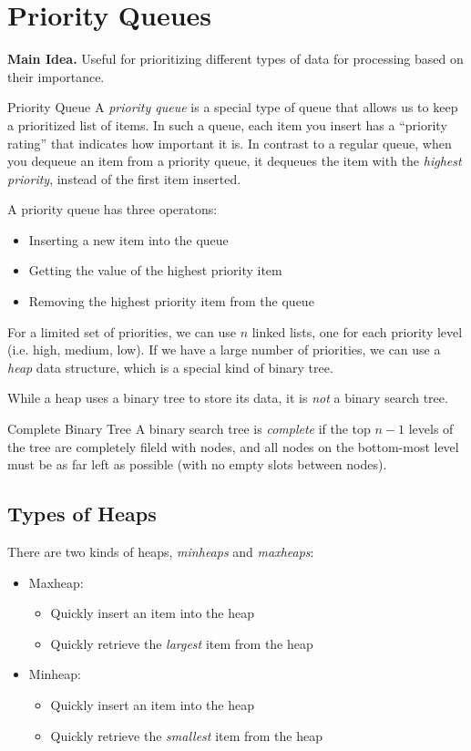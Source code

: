 \documentclass[class=article, crop=false]{standalone}
\begin{document}
  \section{Priority Queues}
  \textbf{Main Idea.} Useful for prioritizing different types of data for processing based on their importance.
  \begin{definition}{Priority Queue}
    A \emph{priority queue} is a special type of queue that allows us to keep a prioritized list of items. In such a queue, each item you insert has a ``priority rating'' that indicates how important it is. In contrast to a regular queue, when you dequeue an item from a priority queue, it dequeues the item with the \emph{highest priority}, instead of the first item inserted.
  \end{definition}
  A priority queue has three operatons:
  \begin{itemize}
    \item Inserting a new item into the queue
    \item Getting the value of the highest priority item
    \item Removing the highest priority item from the queue
  \end{itemize}
  For a limited set of priorities, we can use $n$ linked lists, one for each priority level (i.e. high, medium, low). If we have a large number of priorities, we can use a \emph{heap} data structure, which is a special kind of binary tree.
  \begin{note}{}
    While a heap uses a binary tree to store its data, it is \emph{not} a binary search tree.
  \end{note}
  \begin{definition}{Complete Binary Tree}
    A binary search tree is \emph{complete} if the top $n-1$ levels of the tree are completely fileld with nodes, and all nodes on the bottom-most level must be as far left as possible (with no empty slots between nodes).
  \end{definition}
  \subsection{Types of Heaps}
  There are two kinds of heaps, \emph{minheaps} and \emph{maxheaps}:
  \begin{itemize}
    \item Maxheap:
    \begin{itemize}
      \item Quickly insert an item into the heap
      \item Quickly retrieve the \emph{largest} item from the heap
    \end{itemize}
    \item Minheap:
    \begin{itemize}
      \item Quickly insert an item into the heap
      \item Quickly retrieve the \emph{smallest} item from the heap
    \end{itemize}
  \end{itemize}
\end{document}
